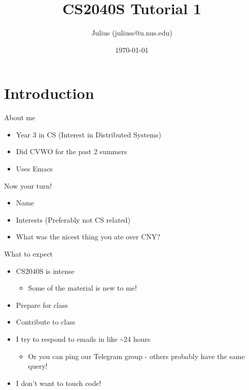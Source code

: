 \documentclass[presentation]{beamer}
\author{Julius (juliuss@u.nus.edu)}
\date{\today}
\title{CS2040S Tutorial 1}
\begin{document}
\maketitle

\section{Introduction}
\label{sec:org0de242e}
\begin{frame}[<+->][label={sec:orgd454d8a}]{About me}
\begin{itemize}
\item Year 3 in CS (Interest in Distributed Systems)
\item Did CVWO for the past 2 summers
\item Uses Emacs
\end{itemize}
\end{frame}
\begin{frame}[label={sec:org0d5804a}]{Now your turn!}
\begin{itemize}
\item Name
\item Interests (Preferably not CS related)
\item What was the nicest thing you ate over CNY?
\end{itemize}
\end{frame}
\begin{frame}[<+->][label={sec:orgabbdc2e}]{What to expect}
\begin{itemize}
\item CS2040S is intense
\begin{itemize}
\item Some of the material is new to me!
\end{itemize}
\item Prepare for class
\item Contribute to class
\item I try to respond to emails in like \textasciitilde{}24 hours
\begin{itemize}
\item Or you can ping our Telegram group - others probably have the
same query!
\end{itemize}
\item I don't want to touch code!
\end{itemize}
\end{frame}
\end{document}
